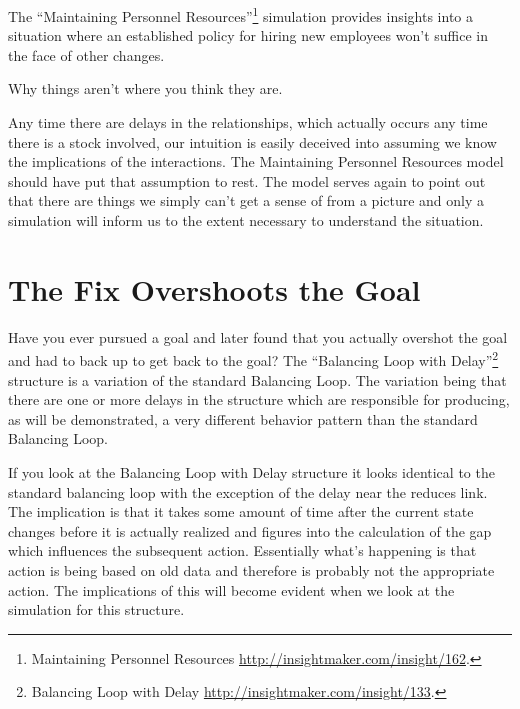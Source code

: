 \documentclass[]{memoir}
\begin{document}
The ``Maintaining Personnel Resources''\footnote{Maintaining Personnel
  Resources \url{http://insightmaker.com/insight/162}.} simulation
provides insights into a situation where an established policy for
hiring new employees won't suffice in the face of other changes.

\FloatBarrier 

\begin{model}[frametitle={Model: Maintaining Personnel Resources}] 

 Why things aren't where you think they are.




 \end{model}

Any time there are delays in the relationships, which actually occurs
any time there is a stock involved, our intuition is easily deceived
into assuming we know the implications of the interactions. The
Maintaining Personnel Resources model should have put that assumption to
rest. The model serves again to point out that there are things we
simply can't get a sense of from a picture and only a simulation will
inform us to the extent necessary to understand the situation.

\section{The Fix Overshoots the Goal}

Have you ever pursued a goal and later found that you actually overshot
the goal and had to back up to get back to the goal? The ``Balancing
Loop with Delay''\footnote{Balancing Loop with Delay
  \url{http://insightmaker.com/insight/133}.} structure is a variation
of the standard Balancing Loop. The variation being that there are one
or more delays in the structure which are responsible for producing, as
will be demonstrated, a very different behavior pattern than the
standard Balancing Loop.

If you look at the Balancing Loop with Delay structure it looks
identical to the standard balancing loop with the exception of the delay
near the reduces link. The implication is that it takes some amount of
time after the current state changes before it is actually realized and
figures into the calculation of the gap which influences the subsequent
action. Essentially what's happening is that action is being based on
old data and therefore is probably not the appropriate action. The
implications of this will become evident when we look at the simulation
for this structure.
\end{document}
